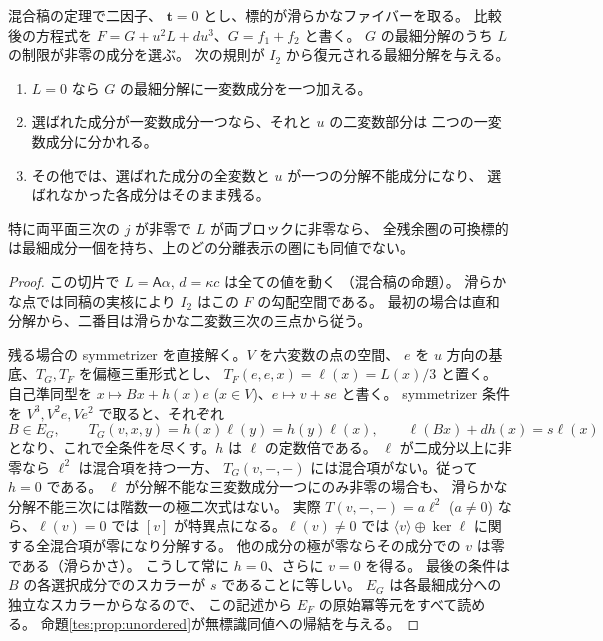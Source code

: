 \begin{proposition}\label{tes:prop:linear-coupling}
混合稿の定理で二因子、
$\mathbf t=0$ とし、標的が滑らかなファイバーを取る。
比較後の方程式を $F=G+u^2L+du^3$、$G=f_1+f_2$ と書く。
$G$ の最細分解のうち $L$ の制限が非零の成分を選ぶ。
次の規則が $I_2$ から復元される最細分解を与える。
\begin{enumerate}
\item $L=0$ なら $G$ の最細分解に一変数成分を一つ加える。
\item 選ばれた成分が一変数成分一つなら、それと $u$ の二変数部分は
二つの一変数成分に分かれる。
\item その他では、選ばれた成分の全変数と $u$ が一つの分解不能成分になり、
選ばれなかった各成分はそのまま残る。
\end{enumerate}
特に両平面三次の $j$ が非零で $L$ が両ブロックに非零なら、
全残余圏の可換標的は最細成分一個を持ち、上のどの分離表示の圏にも同値でない。
\end{proposition}
\begin{proof}
この切片で $L=\mathsf A\alpha$, $d=\kappa c$ は全ての値を動く
（混合稿の命題）。
滑らかな点では同稿の実核により $I_2$ はこの $F$ の勾配空間である。
最初の場合は直和分解から、二番目は滑らかな二変数三次の三点から従う。

残る場合の symmetrizer を直接解く。$V$ を六変数の点の空間、
$e$ を $u$ 方向の基底、$T_G,T_F$ を偏極三重形式とし、
$T_F(e,e,x)=\ell(x)=L(x)/3$ と置く。
自己準同型を $x\mapsto Bx+h(x)e$ ($x\in V$)、$e\mapsto v+se$ と書く。
symmetrizer 条件を $V^3,V^2e,Ve^2$ で取ると、それぞれ
\[
 B\in E_G,\qquad T_G(v,x,y)=h(x)\ell(y)=h(y)\ell(x),\qquad
 \ell(Bx)+d h(x)=s\ell(x)
\]
となり、これで全条件を尽くす。$h$ は $\ell$ の定数倍である。
$\ell$ が二成分以上に非零なら $\ell^2$ は混合項を持つ一方、
$T_G(v,-,-)$ には混合項がない。従って $h=0$ である。
$\ell$ が分解不能な三変数成分一つにのみ非零の場合も、
滑らかな分解不能三次には階数一の極二次式はない。
実際 $T(v,-,-)=a\ell^2$ ($a\ne0$) なら、$\ell(v)=0$ では
$[v]$ が特異点になる。$\ell(v)\ne0$ では
$\langle v\rangle\oplus\ker\ell$ に関する全混合項が零になり分解する。
他の成分の極が零ならその成分での $v$ は零である（滑らかさ）。
こうして常に $h=0$、さらに $v=0$ を得る。
最後の条件は $B$ の各選択成分でのスカラーが $s$ であることに等しい。
$E_G$ は各最細成分への独立なスカラーからなるので、
この記述から $E_F$ の原始冪等元をすべて読める。
命題\ref{tes:prop:unordered}が無標識同値への帰結を与える。
\end{proof}


